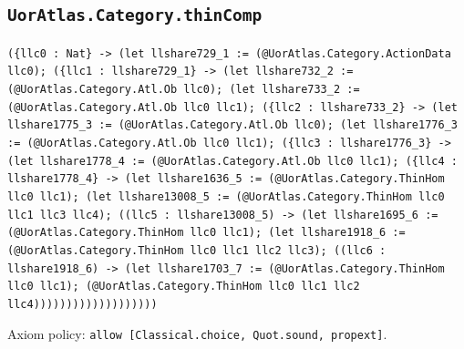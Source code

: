 \documentclass[11pt]{article}
\begin{document}
\subsection*{\texttt{UorAtlas.Category.thinComp}}
\noindent\texttt{(\{llc0 : Nat\} -> (let llshare729\_1 := (@UorAtlas.Category.ActionData llc0); (\{llc1 : llshare729\_1\} -> (let llshare732\_2 := (@UorAtlas.Category.Atl.Ob llc0); (let llshare733\_2 := (@UorAtlas.Category.Atl.Ob llc0 llc1); (\{llc2 : llshare733\_2\} -> (let llshare1775\_3 := (@UorAtlas.Category.Atl.Ob llc0); (let llshare1776\_3 := (@UorAtlas.Category.Atl.Ob llc0 llc1); (\{llc3 : llshare1776\_3\} -> (let llshare1778\_4 := (@UorAtlas.Category.Atl.Ob llc0 llc1); (\{llc4 : llshare1778\_4\} -> (let llshare1636\_5 := (@UorAtlas.Category.ThinHom llc0 llc1); (let llshare13008\_5 := (@UorAtlas.Category.ThinHom llc0 llc1 llc3 llc4); ((llc5 : llshare13008\_5) -> (let llshare1695\_6 := (@UorAtlas.Category.ThinHom llc0 llc1); (let llshare1918\_6 := (@UorAtlas.Category.ThinHom llc0 llc1 llc2 llc3); ((llc6 : llshare1918\_6) -> (let llshare1703\_7 := (@UorAtlas.Category.ThinHom llc0 llc1); (@UorAtlas.Category.ThinHom llc0 llc1 llc2 llc4)))))))))))))))))))}\par
\noindent Axiom policy: \texttt{allow [Classical.choice, Quot.sound, propext]}.\par
\end{document}
